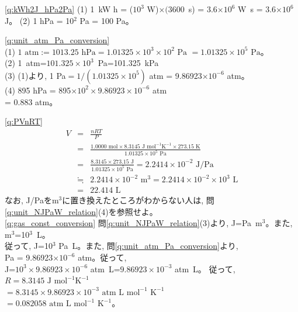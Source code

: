 \ref{q:kWh2J_hPa2Pa}
(1) 1~kW h = ($10^3$ W)$\times(3600$~s) = 3.6$\times 10^6$ W~s = 3.6$\times 10^6$ J。
(2) 1 hPa = 10$^2$ Pa = 100 Pa。\mv


\ref{q:unit_atm_Pa_conversion}　\\
(1) $1\text{ atm} :=1013.25\text{ hPa}=1.01325\times10^3\times10^2\text{ Pa}$
$=1.01325\times10^5\text{ Pa}$。\\
(2) 1~atm=$101.325\times 10^3$~Pa=101.325~kPa\\ 
(3) (1)より, 1 Pa$=1/(1.01325\times10^5)$ atm
= 9.86923$\times10^{-6}$ atm。\\
(4) 895 hPa = 895$\times 10^2\times 9.86923\times10^{-6}$ atm\\
 = 0.883 atm。\mv

\ref{q:PVnRT}
\begin{eqnarray*}
V&=&\frac{nRT}{P}\\
 &=&\frac{1.0000\text{ mol}\times 8.3145\text{ J mol}^{-1}\text{K}^{-1} \times 273.15\text{ K}}{1.01325\times10^5\text{ Pa}}\\
&=&\frac{8.3145\times 273.15\text{ J} }{1.01325\times10^5\text{ Pa}}=2.2414\times10^{-2}\text{ J/Pa}\\
&\fallingdotseq& 2.2414\times10^{-2} \text{ m}^3=2.2414\times10^{-2}\times10^{3}\text{ L}\\
&=&22.414\text{ L}
\end{eqnarray*}
なお, J/Paをm$^3$に置き換えたところがわからない人は, 問\ref{q:unit_NJPaW_relation}(4)を参照せよ。\\

\ref{q:gas_const_conversion} 
問\ref{q:unit_NJPaW_relation}(3)より, J=Pa~m$^3$。また, m$^3$=10$^3$~L。\\
従って, J=10$^3$ Pa~L。また, 問\ref{q:unit_atm_Pa_conversion}より, \\
Pa = 9.86923$\times10^{-6}$ atm。従って, \\
J=$10^3\times 9.86923\times10^{-6}$ atm~L=$9.86923\times10^{-3}$ atm~L。
従って, $R=8.3145 \text{ J~mol}^{-1}\text{K}^{-1}$\\
$=8.3145\times 9.86923\times10^{-3} \text{ atm~L~mol}^{-1}\text{ K}^{-1}$\\
$=0.082058\text{ atm~L~mol}^{-1}\text{ K}^{-1}$。\\

